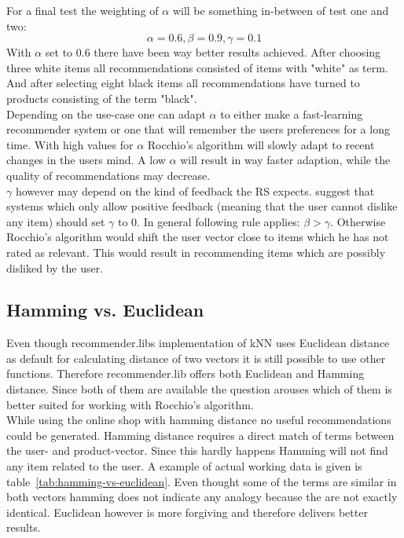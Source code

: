 \noindent
For a final test the weighting of $\alpha$ will be something in-between of test one and two:
$$\alpha = 0.6, \beta = 0.9, \gamma = 0.1$$
With $\alpha$ set to 0.6 there have been way better results achieved.
After choosing three white items all recommendations consisted of items with "white" as term.
\\
And after selecting eight black items all recommendations have turned to products consisting of the term "black".
\\

\noindent
Depending on the use-case one can adapt $\alpha$ to either make a fast-learning recommender system or one that will remember the users preferences for a long time.
With high values for $\alpha$ Rocchio's algorithm will slowly adapt to recent changes in the users mind.
A low $\alpha$ will result in way faster adaption, while the quality of recommendations may decrease.
\\

\noindent
$\gamma$ however may depend on the kind of feedback the RS expects.
\citeauthor{manning:2009} suggest that systems which only allow positive feedback (meaning that the user cannot dislike any item) should set $\gamma$ to 0.\citep[p.~183]{manning:2009}
In general following rule applies: $\beta > \gamma$.
Otherwise Rocchio's algorithm would shift the user vector close to items which he has not rated as relevant.
This would result in recommending items which are possibly disliked by the user.
\\


\subsection{Hamming vs. Euclidean}
\label{sec:hamming-vs-euclidean}
Even though recommender.libs implementation of kNN uses Euclidean distance as default for calculating distance of two vectors it is still possible to use other functions.
Therefore recommender.lib offers both Euclidean and Hamming distance.
Since both of them are available the question arouses which of them is better suited for working with Rocchio's algorithm.
\\
While using the online shop with hamming distance no useful recommendations could be generated.
Hamming distance requires a direct match of terms between the user- and product-vector.
Since this hardly happens Hamming will not find any item related to the user.
A example of actual working data is given is table~\ref{tab:hamming-vs-euclidean}.
Even thought some of the terms are similar in both vectors hamming does not indicate any analogy because the are not exactly identical.
Euclidean however is more forgiving and therefore delivers better results.

